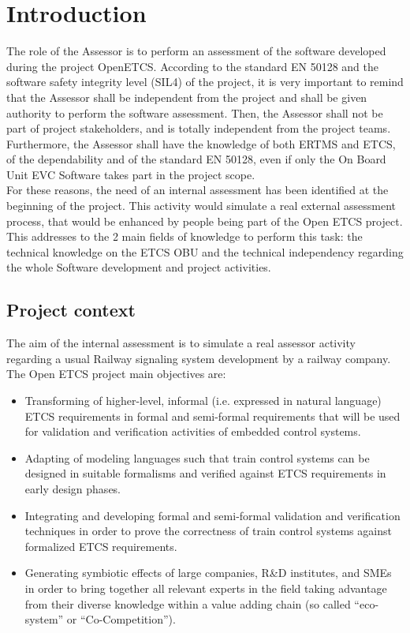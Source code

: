 \documentclass{template/openetcs_article}
\begin{document}
\section{Introduction}
The role of the Assessor is to perform an assessment of the software developed during the project OpenETCS. According to the standard EN 50128 and the software safety integrity level (SIL4) of the project, it is very important to remind that the Assessor shall be independent from the project and shall be given authority to perform the software assessment. Then, the Assessor shall not be part of project stakeholders, and is totally independent from the project teams. Furthermore, the Assessor shall have the knowledge of both ERTMS and ETCS, of the dependability and of the standard EN 50128, even if only the On Board Unit EVC Software takes part in the project scope.
\\
For these reasons, the need of an internal assessment has been identified at the beginning of the project. This activity would simulate a real external assessment process, that would be  enhanced by people being part of the Open ETCS project. This addresses to the 2 main fields of knowledge to perform this task: the technical knowledge on the ETCS OBU and the technical independency regarding the whole Software development and project activities. 

\subsection{Project context}
The aim of the internal assessment is to simulate a real assessor activity regarding a usual Railway signaling system development by a railway company. The Open ETCS project main objectives are:
\begin{itemize}
\item Transforming of higher-level, informal (i.e. expressed in natural language) ETCS requirements in formal and semi-formal requirements that will be used for validation and verification activities of embedded control systems.
\item Adapting of modeling languages such that train control systems can be designed in suitable formalisms and verified against ETCS requirements in early design phases.
\item Integrating and developing formal and semi-formal validation and verification techniques in order to prove the correctness of train control systems against formalized ETCS requirements.
\item Generating symbiotic effects of large companies, R\&D institutes, and SMEs in order to bring together all relevant experts in the field taking advantage from their diverse knowledge within a value adding chain (so called “eco-system” or “Co-Competition”).
\end{itemize}
\end{document}
